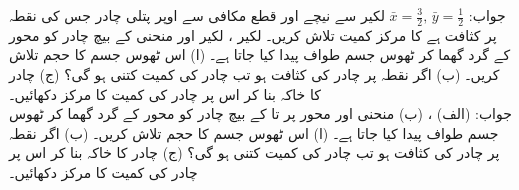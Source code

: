جواب:\quad
$\bar{x}=\tfrac{3}{2},\,\bar{y}=\tfrac{1}{2}$
لکیر  سے نیچے اور قطع مکافی  سے اوپر پتلی چادر جس کی  نقطہ  پر کثافت  ہے کا مرکز کمیت تلاش کریں۔
لکیر ، لکیر  اور منحنی  کے بیچ چادر  کو محور  کے گرد گھما کر ٹھوس جسم طواف پیدا کیا جاتا ہے۔ (ا) اس ٹھوس جسم کا حجم تلاش کریں۔ (ب) اگر نقطہ  پر چادر کی کثافت  ہو تب چادر کی کمیت کتنی ہو گی؟ (ج) چادر کا خاکہ بنا کر اس پر چادر کی کمیت کا مرکز دکھائیں۔\\
جواب:\quad
(الف) ، (ب) 
منحنی  اور محور  پر  تا  کے بیچ چادر  کو محور  کے گرد گھما کر ٹھوس جسم طواف پیدا کیا جاتا ہے۔ (ا) اس ٹھوس جسم کا حجم تلاش کریں۔ (ب) اگر نقطہ  پر چادر کی کثافت  ہو تب چادر کی کمیت کتنی ہو گی؟ (ج) چادر کا خاکہ بنا کر اس پر چادر کی کمیت کا مرکز دکھائیں۔
